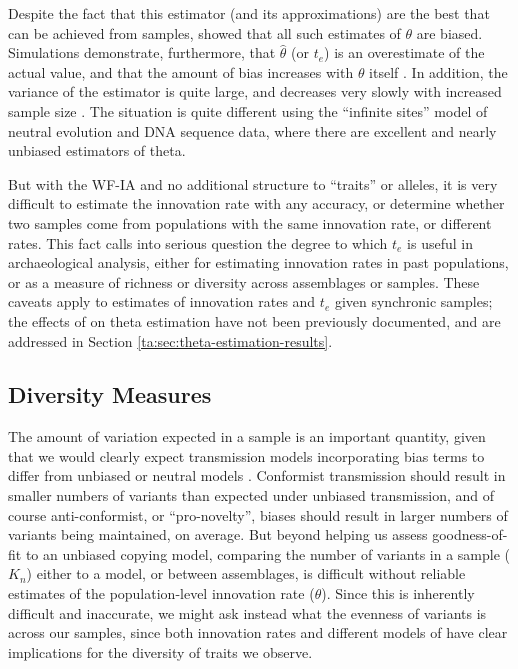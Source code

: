 Despite the fact that this estimator (and its approximations) are the best that can be achieved from samples, \citet{ewens1972sampling} showed that all such estimates of $\theta$ are biased.  Simulations demonstrate, furthermore, that $\hat{\theta}$ (or $t_e$) is an overestimate of the actual value, and that the amount of bias increases with $\theta$ itself \citep{ewens1974some}.   In addition, the variance of the estimator is quite large, and decreases very slowly with increased sample size \citep{durrett2008}.  The situation is quite different using the ``infinite sites'' model of neutral evolution and DNA sequence data, where there are excellent and nearly unbiased estimators of theta.  

But with the WF-IA and no additional structure to ``traits'' or alleles, it is very difficult to estimate the innovation rate with any accuracy, or determine whether two samples come from populations with the same innovation rate, or different rates.  This fact calls into serious question the degree to which $t_e$ is useful in archaeological analysis, either for estimating innovation rates in past populations, or as a measure of richness or diversity across assemblages or samples.  These caveats apply to estimates of innovation rates and $t_e$ given synchronic samples; the effects of \timeav on theta estimation have not been previously documented, and are addressed in Section \ref{ta:sec:theta-estimation-results}.  

   
\subsection{Diversity Measures}\label{ta:sec:diversity-measures}

The amount of variation expected in a sample is an important quantity, given that we would clearly expect transmission models incorporating bias terms to differ from unbiased or neutral models \citep[e.g.][]{Kohler2004}.  Conformist transmission should result in smaller numbers of variants than expected under unbiased transmission, and of course anti-conformist, or ``pro-novelty'', biases should result in larger numbers of variants being maintained, on average.  But beyond helping us assess goodness-of-fit to an unbiased copying model, comparing the number of variants in a sample ($K_n$) either to a model, or between assemblages, is difficult without reliable estimates of the population-level innovation rate ($\theta$).  Since this is inherently difficult and inaccurate, we might ask instead what the evenness of variants is across our samples, since both innovation rates and different models of \ct have clear implications for the diversity of traits we observe.  

